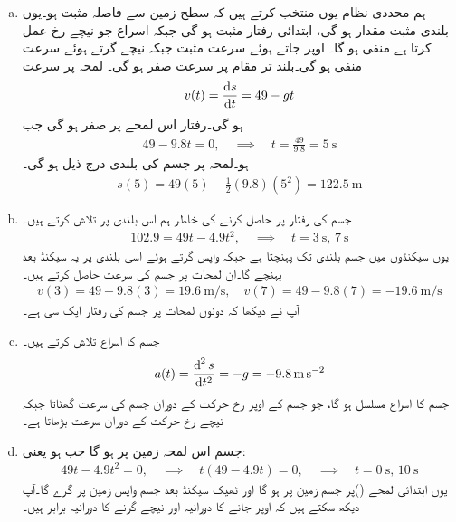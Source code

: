 \begin{enumerate}[a.]

\item
ہم محددی نظام یوں منتخب کرتے ہیں  کہ سطح زمین سے فاصلہ مثبت ہو۔یوں  بلندی  مثبت مقدار ہو گی،  ابتدائی رفتار مثبت ہو گی جبکہ اسراع جو نیچے رخ عمل کرتا ہے منفی ہو گا۔ اوپر جاتے ہوئے سرعت مثبت جبکہ نیچے گرتے ہوئے سرعت منفی ہو گی۔بلند تر  مقام پر سرعت صفر ہو گی۔  لمحہ   پر سرعت
\begin{align*}
v(t)=\frac{\dif s}{\dif t}=49-gt
\end{align*}
ہو گی۔رفتار اس لمحے  پر صفر ہو گی جب 
\begin{align*}
49-9.8t=0,\quad \implies \quad t=\frac{49}{9.8}=\SI{5}{\second}
\end{align*} 
ہو۔لمحہ  پر جسم کی بلندی درج ذیل ہو گی۔
\begin{align*}
s(5)=49(5)-\frac{1}{2}(9.8)(5^2)=\SI{122.5}{\meter}
\end{align*}
\item
جسم کی رفتار  پر حاصل کرنے کی خاطر ہم اس بلندی پر    تلاش کرتے ہیں۔
\begin{align*}
102.9=49t-4.9t^2,\quad \implies \quad t=\SI{3}{\second},\,\SI{7}{\second}
\end{align*}
یوں  سیکنڈوں میں جسم  بلندی تک پہنچتا ہے جبکہ واپس گرتے ہوئے اسی بلندی پر یہ  سیکنڈ بعد پہنچے گا۔ان لمحات پر جسم کی سرعت حاصل کرتے ہیں۔
\begin{align*}
v(3)=49-9.8(3)=\SI{19.6}{\meter\per\second},\quad v(7)=49-9.8(7)=\SI{-19.6}{\meter\per\second}
\end{align*}
آپ نے دیکھا کہ دونوں لمحات پر جسم کی رفتار ایک  سی ہے۔
\item
جسم کا  اسراع تلاش کرتے ہیں۔
\begin{align*}
a(t)=\frac{\dif^{\,2}s}{\dif t^2}=-g=\SI{-9.8}{\meter\per\second\squared}
\end{align*}
جسم کا اسراع مسلسل   ہو گا، جو جسم کے  اوپر  رخ حرکت کے دوران جسم کی    سرعت  گھٹاتا    جبکہ نیچے  رخ حرکت کے دوران   سرعت  بڑھاتا ہے۔ 
\item
جسم  اس لمحہ زمین پر ہو گا جب  ہو یعنی:
\begin{align*}
49t-4.9t^2=0,\quad \implies \quad t(49-4.9t)=0,\quad \implies \quad t=\SI{0}{\second}, \, \SI{10}{\second}
\end{align*}
یوں ابتدائی لمحے  ()پر جسم زمین پر ہو گا اور ٹھیک  سیکنڈ بعد  جسم   واپس زمین پر گرے گا۔آپ دیکھ سکتے ہیں کہ اوپر جانے کا دورانیہ اور نیچے گرنے کا دورانیہ  برابر ہیں۔
\end{enumerate}
